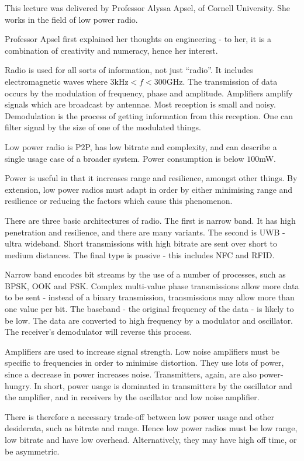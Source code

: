 		This lecture was delivered by Professor Alyssa Apsel, of Cornell University. She works in the field of low power radio.

		Professor Apsel first explained her thoughts on engineering - to her, it is a combination of creativity and numeracy, hence her interest.

		Radio is used for all sorts of information, not just ``radio''. It includes electromagnetic waves where \(3\text{kHz} < f < 300\text{GHz}\). The transmission of data occurs by the modulation of frequency, phase and amplitude. Amplifiers amplify signals which are broadcast by antennae. Most reception is small and noisy. Demodulation is the process of getting information from this reception. One can filter signal by the size of one of the modulated things.

		Low power radio is P2P, has low bitrate and complexity, and can describe a single usage case of a broader system. Power consumption is below \(100\)mW.

		Power is useful in that it increases range and resilience, amongst other things. By extension, low power radios must adapt in order by either minimising range and resilience or reducing the factors which cause this phenomenon.

		There are three basic architectures of radio. The first is narrow band. It has high penetration and resilience, and there are many variants. The second is UWB - ultra wideband. Short transmissions with high bitrate are sent over short to medium distances. The final type is passive - this includes NFC and RFID.

		Narrow band encodes bit streams by the use of a number of processes, such as BPSK, OOK and FSK. Complex multi-value phase transmissions allow more data to be sent - instead of a binary transmission, transmissions may allow more than one value per bit. The baseband - the original frequency of the data - is likely to be low. The data are converted to high frequency by a modulator and oscillator. The receiver's demodulator will reverse this process.

		Amplifiers are used to increase signal strength. Low noise amplifiers must be specific to frequencies in order to minimise distortion. They use lots of power, since a decrease in power increases noise. Transmitters, again, are also power-hungry. In short, power usage is dominated in transmitters by the oscillator and the amplifier, and in receivers by the oscillator and low noise amplifier.

		There is therefore a necessary trade-off between low power usage and other desiderata, such as bitrate and range. Hence low power radios must be low range, low bitrate and have low overhead. Alternatively, they may have high off time, or be asymmetric.

